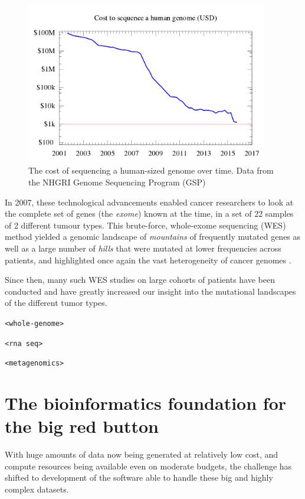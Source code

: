 \begin{figure}[h!]
    \centering
    \includegraphics[width=300pt]{chapters/images/Historic_cost_of_sequencing_a_human_genome.png}
    \caption{The cost of sequencing a human-sized genome over time. Data from the NHGRI Genome Sequencing Program (GSP) }
    \label{fig:seqcost}
\end{figure}

In 2007, these technological advancements enabled cancer researchers to look at the complete set of genes (the \textit{exome}) known at the time, in a set of 22 samples of 2 different tumour types. This brute-force, whole-exome sequencing (WES) method yielded a genomic landscape of \textit{mountains} of frequently mutated genes as well as a large number of \textit{hills} that were mutated at lower frequencies across patients, and highlighted once again the vast heterogeneity of cancer genomes \cite{wood2007genomic}.

Since then, many such WES studies on large cohorts of patients have been conducted \cite{wheeler2013human} and have greatly increased our insight into the mutational landscapes of the different tumor types.

\verb+<whole-genome>+

\verb+<rna seq>+

\verb+<metagenomics>+

\newpage
\section{The bioinformatics foundation for the big red button}

With huge amounts of data now being generated at relatively low cost, and compute resources being available even on moderate budgets, the challenge has shifted to development of the software able to handle these big and highly complex datasets.

